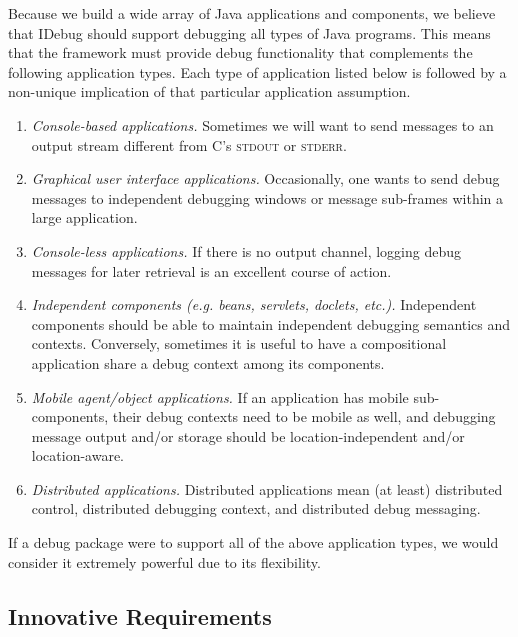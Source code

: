 \documentclass{article}
\begin{document}
Because we build a wide array of Java applications and components, we
believe that IDebug should support debugging all types of Java
programs.  This means that the framework must provide debug
functionality that complements the following application types.  Each
type of application listed below is followed by a non-unique
implication of that particular application assumption.
\begin{enumerate}
\item \emph{Console-based applications.} Sometimes we will want to
  send messages to an output stream different from C's \textsc{stdout}
  or \textsc{stderr}.
\item \emph{Graphical user interface applications.} Occasionally, one
  wants to send debug messages to independent debugging windows or
  message sub-frames within a large application.
\item \emph{Console-less applications.} If there is no output channel,
  logging debug messages for later retrieval is an excellent course of
  action. 
\item \emph{Independent components (e.g. beans, servlets, doclets,
    etc.).} Independent components should be able to maintain
  independent debugging semantics and contexts.  Conversely, sometimes
  it is useful to have a compositional application share a debug
  context among its components.
\item \emph{Mobile agent/object applications.} If an application has
  mobile sub-components, their debug contexts need to be mobile as
  well, and debugging message output and/or storage should be
  location-independent and/or location-aware.
\item \emph{Distributed applications.} Distributed applications mean
  (at least) distributed control, distributed debugging context, and
  distributed debug messaging.
\end{enumerate}

If a debug package were to support all of the above application types,
we would consider it extremely powerful due to its flexibility.

\subsection{Innovative Requirements}
\label{sec:innovation}
\end{document}
